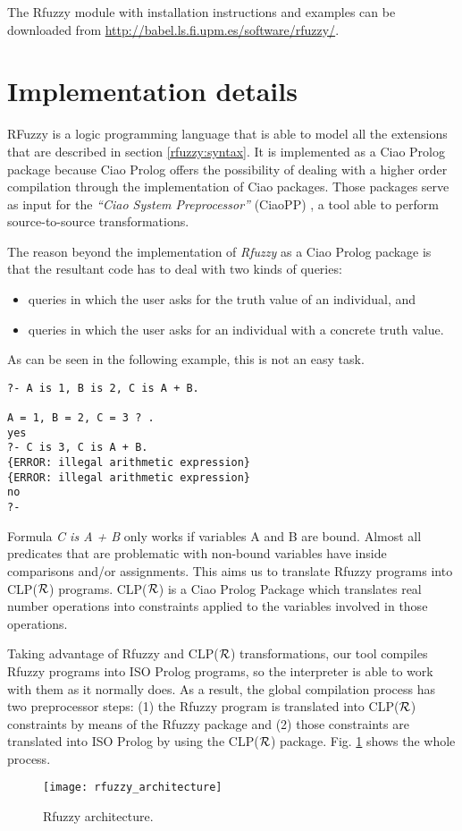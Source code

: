 \documentclass[runningheads,a4paper]{llncs}
\begin{document}
The Rfuzzy module with installation instructions and examples can be
downloaded from \url{http://babel.ls.fi.upm.es/software/rfuzzy/}.



\section{Implementation details}

RFuzzy is a logic programming language that is able to model 
all the extensions that are described in section
\ref{rfuzzy:syntax}. 
It is implemented as a Ciao Prolog \cite{ciao-prolog:site} 
package because Ciao Prolog offers the possibility of dealing 
with a higher order compilation through the implementation 
of Ciao packages.
Those packages serve as input for the 
{\it``Ciao System Preprocessor''} (CiaoPP) \cite{ciaopp-manual}, 
a tool able to perform source-to-source transformations.

The reason beyond the implementation of {\it Rfuzzy } as a Ciao 
Prolog package is that 
the resultant code has to deal with two kinds of queries:
\begin{itemize}
\item queries in which the user asks for the truth value of an individual, and
\item queries in which the user asks for an individual with a concrete truth value.
\end{itemize}

As can be seen in the following example, 
this is not an easy task.
\begin{verbatim}
?- A is 1, B is 2, C is A + B.

A = 1, B = 2, C = 3 ? .
yes
?- C is 3, C is A + B.
{ERROR: illegal arithmetic expression}
{ERROR: illegal arithmetic expression}
no
?- 
\end{verbatim}

Formula {\it C is A + B} only works if variables A and B are bound.
Almost all predicates that are problematic with non-bound 
variables have inside comparisons and/or assignments. 
This aims us to translate Rfuzzy programs into CLP(${\cal R}$) 
programs. 
CLP(${\cal R}$) is a Ciao Prolog Package which translates real
number operations into constraints applied to the variables 
involved in those operations. 

Taking advantage of Rfuzzy and CLP(${\cal R}$) transformations, 
our tool compiles Rfuzzy programs into ISO Prolog programs,
so the interpreter is able to work with them as it normally does.
As a result, the global compilation process has two 
preprocessor steps:
(1) the Rfuzzy program is translated into CLP(${\cal R}$) 
constraints by means of the Rfuzzy package and 
(2) those constraints are translated into ISO Prolog by using 
the CLP(${\cal R}$) package. 
Fig. \ref{fig:rfuzzy_architecture} shows the whole process.
\begin{figure}
\centering
\texttt{[image: rfuzzy\_architecture]} 
\caption{Rfuzzy architecture.}
\label{fig:rfuzzy_architecture}
\end{figure}
\end{document}
